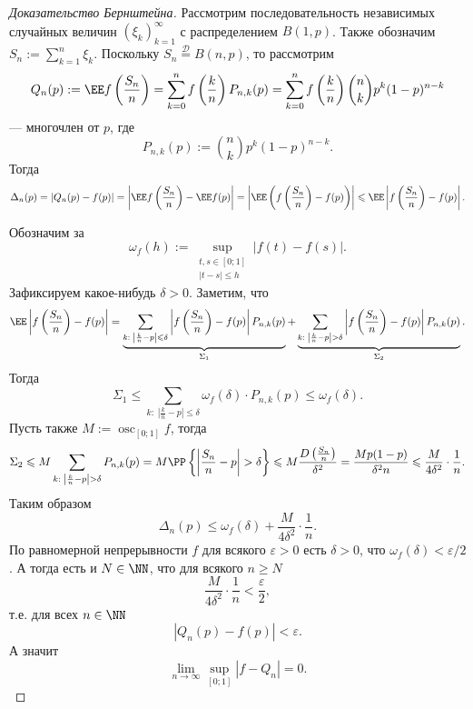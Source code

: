 \documentclass[12pt,a4paper]{article}
\DeclareMathOperator*{\osc}{osc}
\newcommand{\Deq}{\mathrel{\stackrel{\mathcal{D}}{=}}}
\begin{document}
    \begin{proof}[Доказательство Бернштейна]
        Рассмотрим последовательность независимых случайных величин $(\xi_k)_{k=1}^\infty$ с распределением $B(1, p)$. Также обозначим $S_n := \sum_{k=1}^n \xi_k$. Поскольку $S_n \Deq B(n, p)$, то рассмотрим
        \[Q_n(p) := \EE f\left(\frac{S_n}{n}\right) = \sum_{k=0}^n f\left(\frac{k}{n}\right) P_{n,k}(p) = \sum_{k=0}^n f\left(\frac{k}{n}\right) \binom{n}{k} p^k (1-p)^{n-k}\]
        --- многочлен от $p$, где
        \[P_{n, k}(p) := \binom{n}{k} p^k (1-p)^{n-k}.\]
        Тогда
        \[
            \Delta_n(p)
            = |Q_n(p) - f(p)|
            = \left|\EE f\left(\frac{S_n}{n}\right) - \EE f(p)\right|
            = \left|\EE \left(f\left(\frac{S_n}{n}\right) - f(p)\right)\right|
            \leqslant \EE \left|f\left(\frac{S_n}{n}\right) - f(p)\right|.
        \]

        Обозначим за
        \[\omega_f(h) := \sup_{\substack{t, s \in [0; 1]\\ |t-s| \leqslant h}} |f(t) - f(s)|.\]
        Зафиксируем какое-нибудь $\delta > 0$. Заметим, что
        \[
            \EE \left|f\left(\frac{S_n}{n}\right) - f(p)\right| =
            \underbrace{\sum_{k:\; \left|\frac{k}{n} - p\right| \leqslant \delta} \left|f\left(\frac{S_n}{n}\right) - f(p)\right| P_{n, k}(p)}_{\Sigma_1} +
            \underbrace{\sum_{k:\; \left|\frac{k}{n} - p\right| > \delta} \left|f\left(\frac{S_n}{n}\right) - f(p)\right| P_{n, k}(p)}_{\Sigma_2}.
        \]
        Тогда
        \[
            \Sigma_1
            \leqslant \sum_{k:\; \left|\frac{k}{n} - p\right| \leqslant \delta} \omega_f(\delta) \cdot P_{n, k}(p)
            \leqslant \omega_f(\delta).
        \]
        Пусть также $M := \osc_{[0; 1]} f$, тогда
        \[
            \Sigma_2
            \leqslant M \sum_{k:\; \left|\frac{k}{n} - p\right| > \delta} P_{n, k}(p)
            = M \PP\left\{\left|\frac{S_n}{n}-p\right| > \delta\right\}
            \leqslant M \frac{D\left(\frac{S_n}{n}\right)}{\delta^2}
            = \frac{Mp(1-p)}{\delta^2 n}
            \leqslant \frac{M}{4\delta^2} \cdot \frac{1}{n}.
        \]
        Таким образом
        \[\Delta_n(p) \leqslant \omega_f(\delta) + \frac{M}{4\delta^2} \cdot \frac{1}{n}.\]
        По равномерной непрерывности $f$ для всякого $\varepsilon > 0$ есть $\delta > 0$, что $\omega_f(\delta) < \varepsilon/2$. А тогда есть и $N \in \NN$, что для всякого $n \geqslant N$
        \[\frac{M}{4\delta^2} \cdot \frac{1}{n} < \frac{\varepsilon}{2},\]
        т.е. для всех $n \in \NN$
        \[|Q_n(p) - f(p)| < \varepsilon.\]
        А значит
        \[\lim_{n \to \infty} \sup_{[0; 1]} |f - Q_n| = 0.\]
    \end{proof}
\end{document}
